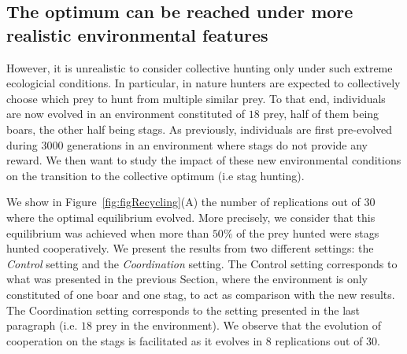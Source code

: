   \subsection{The optimum can be reached under more realistic environmental features}
    However, it is unrealistic to consider collective hunting only under such extreme ecologicial conditions. In particular, in nature hunters are expected to collectively choose which prey to hunt from multiple similar prey. To that end, individuals are now evolved in an environment constituted of $18$ prey, half of them being boars, the other half being stags. As previously, individuals are first pre-evolved during $3000$ generations in an environment where stags do not provide any reward. We then want to study the impact of these new environmental conditions on the transition to the collective optimum (i.e stag hunting).

    We show in Figure~\ref{fig:figRecycling}(A) the number of replications out of $30$ where the optimal equilibrium evolved. More precisely, we consider that this equilibrium was achieved when more than \(50\%\) of the prey hunted were stags hunted cooperatively. We present the results from two different settings: the \emph{Control} setting and the \emph{Coordination} setting. The Control setting corresponds to what was presented in the previous Section, where the environment is only constituted of one boar and one stag, to act as comparison with the new results. The Coordination setting corresponds to the setting presented in the last paragraph (i.e. $18$ prey in the environment). We observe that the evolution of cooperation on the stags is facilitated as it evolves in $8$ replications out of $30$. 

